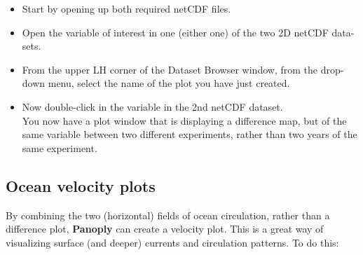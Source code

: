 \documentclass[11pt,fleqn]{book} %
\begin{document}
\begin{itemize}
\vspace{1mm}
\item Start by opening up both required netCDF files.
\vspace{1mm}
\item Open the variable of interest in one (either one) of the two 2D netCDF data-sets.
\vspace{1mm}
\item From the upper LH corner of the Dataset Browser window, from the drop-down menu, select the name of the plot you have just created.
\vspace{1mm}
\item Now double-click in the variable in the 2nd netCDF dataset.
\\ You now have a plot window that is displaying a difference map, but of the same variable between two different experiments, rather than two years of the same experiment.
\end{itemize}
\vspace{2mm}


\subsection{Ocean velocity plots}

By combining the two (horizontal) fields of ocean circulation, rather than a difference plot, \textbf{Panoply} can create a velocity plot. This is a great way of visualizing surface (and deeper) currents and circulation patterns. To do this:
\end{document}
